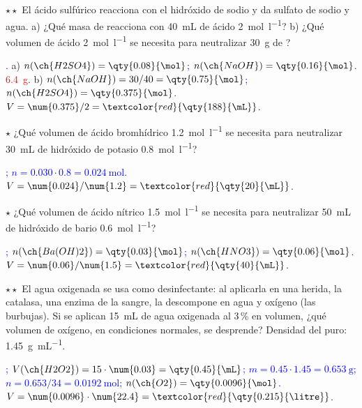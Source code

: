 \begin{exercise}
    \(\star\star\) El ácido sulfúrico reacciona con el hidróxido de sodio y da sulfato de sodio y agua. a) ¿Qué masa de 
    reacciona con \qty{40}{\mL} de ácido \qty{2}{\mol\per\litre}? b) ¿Qué volumen de ácido \qty{2}{\mol\per\litre} se necesita
    para neutralizar \qty{30}{\gram} de ?
    \begin{solu}
        \textcolor{blue}{.} a) \textcolor{blue}{\(n(\ch{H2SO4}) = \qty{0.08}{\mol}\);
        \(n(\ch{NaOH}) = \qty{0.16}{\mol}\).} \textcolor{red}{\qty{6.4}{\gram}}. b) \textcolor{blue}{\(n(\ch{NaOH}) = 30/40 =
        \qty{0.75}{\mol}\); \(n(\ch{H2SO4}) = \qty{0.375}{\mol}\).} \(V = \num{0.375}/2 = \textcolor{red}{\qty{188}{\mL}}\).
    \end{solu}
\end{exercise}

\begin{exercise}
    \(\star\) ¿Qué volumen de ácido bromhídrico \qty{1.2}{\mol\per\litre} se necesita para neutralizar \qty{30}{\mL} de hidróxido de
    potasio \qty{0.8}{\mol\per\litre}?
    \begin{solu}
        \textcolor{blue}{; \(n = \num{0.030} \cdot \num{0.8} = \qty{0.024}{\mol}\).}
        \(V = \num{0.024}/\num{1.2} = \textcolor{red}{\qty{20}{\mL}}\).
    \end{solu}
\end{exercise}

\begin{exercise}
    \(\star\) ¿Qué volumen de ácido nítrico \qty{1.5}{\mol\per\litre} se necesita para neutralizar \qty{50}{\mL} de hidróxido de
    bario \qty{0.6}{\mol\per\litre}?
    \begin{solu}
        \textcolor{blue}{; \(n(\ch{Ba(OH)2}) = \qty{0.03}{\mol}\); \(n(\ch{HNO3}) = \qty{0.06}{\mol}\).}
        \(V = \num{0.06}/\num{1.5} = \textcolor{red}{\qty{40}{\mL}}\).
    \end{solu}
\end{exercise}

\begin{exercise}
    \(\star\star\) El agua oxigenada se usa como desinfectante: al aplicarla en una herida, la catalasa, una enzima de la sangre, la
    descompone en agua y oxígeno (las burbujas). Si se aplican \qty{15}{\mL} de agua oxigenada al 3\,\% en volumen, ¿qué volumen de
    oxígeno, en condiciones normales, se desprende? Densidad del  puro: \qty{1.45}{\gram\per\mL}.
    \begin{solu}
        \textcolor{blue}{; \(V(\ch{H2O2}) = 15 \cdot \num{0.03} = \qty{0.45}{\mL}\); \(m = \num{0.45} \cdot \num{1.45} =
        \qty{0.653}{\gram}\); \(n = \num{0.653}/34 = \qty{0.0192}{\mol}\); \(n(\ch{O2}) = \qty{0.0096}{\mol}\).}
        \(V = \num{0.0096} \cdot \num{22.4} = \textcolor{red}{\qty{0.215}{\litre}}\).
    \end{solu}
\end{exercise}

